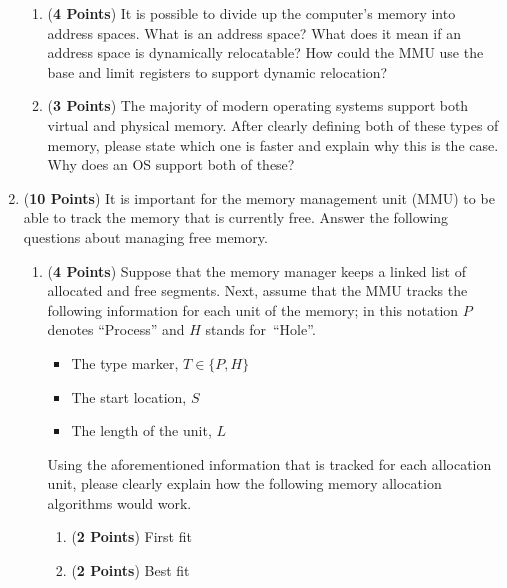\documentclass[12pt,epsf,psfig,graphics]{article}
\begin{document}
\begin{enumerate}
\begin{enumerate}
    \item ({\bf 4 Points}) It is possible to divide up the computer's memory into address spaces.  What is an address
      space?  What does it mean if an address space is dynamically relocatable? How could the MMU use the base and limit
      registers to support dynamic relocation?   

    \item ({\bf 3 Points}) The majority of modern operating systems support both virtual and physical memory.  After
      clearly defining both of these types of memory, please state which one is faster and explain why this is the case.
      Why does an OS support both of these?

  \end{enumerate}
        
\newpage

% 
\item ({\bf 10 Points}) It is important for the memory management unit (MMU) to be able to track the memory that is
  currently free.  Answer the following questions about managing free memory.

  \begin{enumerate}
          
  \item ({\bf 4 Points}) Suppose that the memory manager keeps a linked list of allocated and free segments.  Next,
    assume that the MMU tracks the following information for each unit of the memory; in this notation $P$
    denotes ``Process'' and $H$ stands \mbox{for ``Hole''}.

    \begin{itemize}
      \item The type marker, $T \in \{P, H\}$
      \item The start location, $S$
      \item The length of the unit, $L$
    \end{itemize}

    Using the aforementioned information that is tracked for each allocation unit, please clearly explain how the
    following memory allocation algorithms would work.

    \begin{enumerate}
      \item ({\bf 2 Points}) First fit
      \item ({\bf 2 Points}) Best fit
    \end{enumerate}


\end{enumerate}
\end{enumerate}
\end{document}
